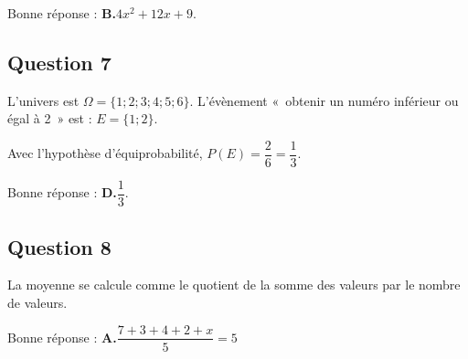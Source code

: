 	Bonne réponse : \textbf{B.}\quad $4x^2+12x+9$.


\subsection*{Question 7}

L'univers est $\Omega = \lbrace 1 ; 2 ; 3 ; 4 ; 5 ; 6 \rbrace$. L'évènement «~obtenir un numéro inférieur ou égal à 2~» est : $E = \lbrace 1 ; 2  \rbrace$.

Avec l'hypothèse d'équiprobabilité, $P(E) = \dfrac{2}{6} = \dfrac{1}{3}$.

Bonne réponse : \textbf{D.}\quad $ \dfrac{1}{3} $.

\subsection*{Question 8}

La moyenne se calcule comme le quotient de la somme des valeurs par le nombre de valeurs.

Bonne réponse : \textbf{A.}\quad $\dfrac{7+3+4+2+x}{5}=5$

